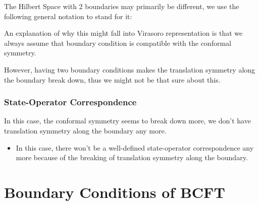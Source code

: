The Hilbert Space with 2 boundaries may primarily be different, we
use the following general notation to stand for it:

An explanation of why this might fall into Virasoro representation is
that we always assume that boundary condition is compatible with the
conformal symmetry.

However, having two boundary conditions makes the translation
symmetry along the boundary break down, thus we might not be that
sure about this.


\subsubsection{State-Operator Correspondence}

In this case, the conformal symmetry seems to break down more, we
don't have translation symmetry along the boundary any more.
\begin{itemize}
  \item In this case, there won't be a well-defined state-operator
    correspondence any more because of the breaking of translation
    symmetry along the boundary.
\end{itemize}

\newpage

\section{Boundary Conditions of BCFT}\label{sec:Bootstrapping BCFT} %

